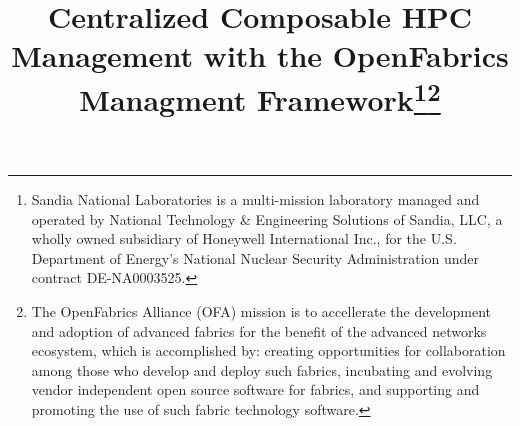 \documentclass[conference]{IEEEtran}
\begin{document}
\title{Centralized Composable HPC Management with the OpenFabrics Managment Framework\thanks{Sandia National Laboratories is a multi-mission laboratory managed and operated by National Technology \& Engineering Solutions of Sandia, LLC, a wholly owned subsidiary of Honeywell International Inc., for the U.S. Department of Energy’s National Nuclear Security Administration under contract DE-NA0003525.}\thanks{The OpenFabrics Alliance (OFA) mission is to accellerate the development and adoption of advanced fabrics for the benefit of the advanced networks ecosystem, which is accomplished by: creating opportunities for collaboration among those who develop and deploy such fabrics, incubating and evolving vendor independent open source software for fabrics, and supporting and promoting the use of such fabric technology software.}
}

\author{
\and
{}
\and
{}
\and
{}
}

\maketitle
\end{document}
